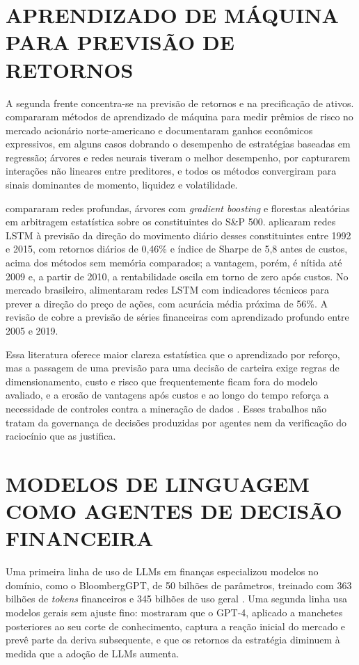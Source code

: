 \section{APRENDIZADO DE MÁQUINA PARA PREVISÃO DE RETORNOS}

A segunda frente concentra-se na previsão de retornos e na precificação de ativos. \citet{Gu2020} compararam métodos de aprendizado de máquina para medir prêmios de risco no mercado acionário norte-americano e documentaram ganhos econômicos expressivos, em alguns casos dobrando o desempenho de estratégias baseadas em regressão; árvores e redes neurais tiveram o melhor desempenho, por capturarem interações não lineares entre preditores, e todos os métodos convergiram para sinais dominantes de momento, liquidez e volatilidade.

\citet{Krauss2017} compararam redes profundas, árvores com \textit{gradient boosting} e florestas aleatórias em arbitragem estatística sobre os constituintes do S\&P 500. \citet{Fischer2018} aplicaram redes LSTM à previsão da direção do movimento diário desses constituintes entre 1992 e 2015, com retornos diários de 0,46\% e índice de Sharpe de 5,8 antes de custos, acima dos métodos sem memória comparados; a vantagem, porém, é nítida até 2009 e, a partir de 2010, a rentabilidade oscila em torno de zero após custos. No mercado brasileiro, \citet{Nelson2017} alimentaram redes LSTM com indicadores técnicos para prever a direção do preço de ações, com acurácia média próxima de 56\%. A revisão de \citet{Sezer2020} cobre a previsão de séries financeiras com aprendizado profundo entre 2005 e 2019.

Essa literatura oferece maior clareza estatística que o aprendizado por reforço, mas a passagem de uma previsão para uma decisão de carteira exige regras de dimensionamento, custo e risco que frequentemente ficam fora do modelo avaliado, e a erosão de vantagens após custos e ao longo do tempo \citep{Fischer2018} reforça a necessidade de controles contra a mineração de dados \citep{White2000, Hansen2005, LopezDePrado2018}. Esses trabalhos não tratam da governança de decisões produzidas por agentes nem da verificação do raciocínio que as justifica.

\section{MODELOS DE LINGUAGEM COMO AGENTES DE DECISÃO FINANCEIRA}

Uma primeira linha de uso de LLMs em finanças especializou modelos no domínio, como o BloombergGPT, de 50 bilhões de parâmetros, treinado com 363 bilhões de \textit{tokens} financeiros e 345 bilhões de uso geral \citep{Wu2023}. Uma segunda linha usa modelos gerais sem ajuste fino: \citet{LopezLira2023} mostraram que o GPT-4, aplicado a manchetes posteriores ao seu corte de conhecimento, captura a reação inicial do mercado e prevê parte da deriva subsequente, e que os retornos da estratégia diminuem à medida que a adoção de LLMs aumenta.

